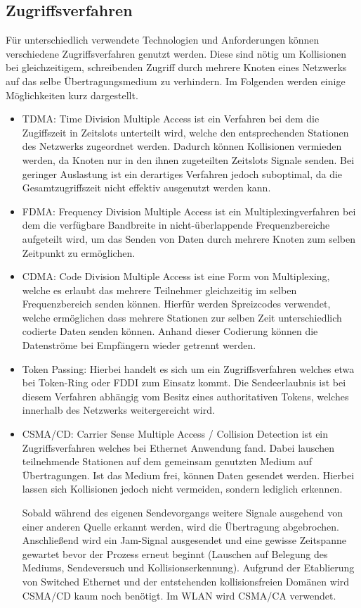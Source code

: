     \subsection{Zugriffsverfahren}
    Für unterschiedlich verwendete Technologien und Anforderungen können verschiedene Zugriffsverfahren genutzt werden. Diese sind nötig um Kollisionen bei gleichzeitigem,
    schreibenden Zugriff durch mehrere Knoten eines Netzwerks auf das selbe Übertragungsmedium zu verhindern. Im Folgenden werden einige Möglichkeiten kurz dargestellt.
        \begin{itemize}
            \item TDMA: Time Division Multiple Access ist ein Verfahren bei dem die Zugiffszeit in Zeitslots unterteilt wird, welche den entsprechenden
            Stationen des Netzwerks zugeordnet werden. Dadurch können Kollisionen vermieden werden, da Knoten nur in den ihnen zugeteilten Zeitslots Signale 
            senden. Bei geringer Auslastung ist ein derartiges Verfahren jedoch suboptimal, da die Gesamtzugriffszeit nicht effektiv ausgenutzt werden kann.
            \item FDMA: Frequency Division Multiple Access ist ein Multiplexingverfahren bei dem die verfügbare Bandbreite in nicht-überlappende Frequenzbereiche aufgeteilt wird,
            um das Senden von Daten durch mehrere Knoten zum selben Zeitpunkt zu ermöglichen.
            \item CDMA: Code Division Multiple Access ist eine Form von Multiplexing, welche es erlaubt das mehrere Teilnehmer gleichzeitig im selben Frequenzbereich
            senden können. Hierfür werden Spreizcodes verwendet, welche ermöglichen dass mehrere Stationen zur selben Zeit unterschiedlich codierte Daten senden können.
            Anhand dieser Codierung können die Datenströme bei Empfängern wieder getrennt werden.
            \item Token Passing: Hierbei handelt es sich um ein Zugriffsverfahren welches etwa bei Token-Ring oder FDDI zum Einsatz kommt. Die Sendeerlaubnis ist bei diesem
            Verfahren abhängig vom Besitz eines authoritativen Tokens, welches innerhalb des Netzwerks weitergereicht wird.
            \item CSMA/CD: Carrier Sense Multiple Access / Collision Detection ist ein Zugriffsverfahren welches bei Ethernet Anwendung fand. Dabei lauschen teilnehmende Stationen
            auf dem gemeinsam genutzten Medium auf Übertragungen. Ist das Medium frei, können Daten gesendet werden. Hierbei lassen sich Kollisionen jedoch nicht vermeiden, sondern lediglich 
            erkennen. 
            
            Sobald während des eigenen Sendevorgangs weitere Signale ausgehend von einer anderen Quelle erkannt werden, wird die Übertragung abgebrochen. Anschließend wird ein
            Jam-Signal ausgesendet und eine gewisse Zeitspanne gewartet bevor der Prozess erneut beginnt (Lauschen auf Belegung des Mediums, Sendeversuch und Kollisionserkennung).
            Aufgrund der Etablierung von Switched Ethernet und der entstehenden kollisionsfreien Domänen wird CSMA/CD kaum noch benötigt. Im WLAN wird CSMA/CA verwendet.
        \end{itemize}
